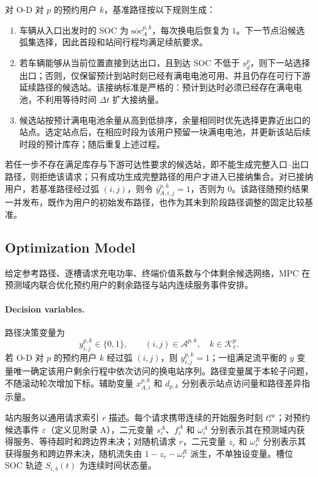 \documentclass[12pt,a4paper,UTF8]{ctexart}
\begin{document}
对 O-D 对 $p$ 的预约用户 $k$，基准路径按以下规则生成：
\begin{enumerate}
  \item 车辆从入口出发时的 SOC 为 $\overline{\mathrm{soc}}_A^{p,k}$，每次换电后恢复为 $1$。下一节点沿候选弧集选择，因此首段和站间行程均满足续航要求。
  \item 若车辆能够从当前位置直接到达出口，且到达 SOC 不低于 $\underline s_d^p$，则下一站选择出口；否则，仅保留预计到站时刻已经有满电电池可用、并且仍存在可行下游延续路径的候选站。该接纳标准是严格的：预计到达时必须已经存在满电电池，不利用等待时间 $\Delta t$ 扩大接纳量。
  \item 候选站按预计满电电池余量从高到低排序，余量相同时优先选择更靠近出口的站点。选定站点后，在相应时段为该用户预留一块满电电池，并更新该站后续时段的预计库存；随后重复上述过程。
\end{enumerate}

若任一步不存在满足库存与下游可达性要求的候选站，即不能生成完整入口--出口路径，则拒绝该请求；只有成功生成完整路径的用户才进入已接纳集合。对已接纳用户，若基准路径经过弧 $(i,j)$，则令 $\bar y_{A,i,j}^{p,k}=1$，否则为 $0$。该路径随预约结果一并发布，既作为用户的初始发布路径，也作为其未到阶段路径调整的固定比较基准。


\subsection{Optimization Model}

给定参考路径、逐槽请求充电功率、终端价值系数与个体剩余候选网络，MPC 在预测域内联合优化预约用户的剩余路径与站内连续服务事件安排。

\paragraph{Decision variables.}
路径决策变量为
\[
y_{i,j}^{p,k}\in\{0,1\},
\qquad
(i,j)\in\mathcal A^{p,k},
\quad
k\in\mathcal K_\ell^p.
\]
若 O-D 对 $p$ 的预约用户 $k$ 经过弧 $(i,j)$，则 $y_{i,j}^{p,k}=1$；一组满足流平衡的 $y$ 变量唯一确定该用户剩余行程中依次访问的换电站序列。路径变量属于本轮子问题，不随滚动轮次增加下标。辅助变量 $x_{A,i}^{p,k}$ 和 $d_{p,k}$ 分别表示站点访问量和路径差异指示量。

站内服务以通用请求索引 $r$ 描述。每个请求携带连续的开始服务时刻 $t_r^{\mathrm{sw}}$；对预约候选事件 $\varepsilon$（定义见附录 A），二元变量 $s_\varepsilon^A$、$f_\varepsilon^A$ 和 $\omega_\varepsilon^A$ 分别表示其在预测域内获得服务、等待超时和跨边界未决；对随机请求 $r$，二元变量 $z_r$ 和 $\omega_r^R$ 分别表示其获得服务和跨边界未决，随机流失由 $1-z_r-\omega_r^R$ 派生，不单独设变量。槽位 SOC 轨迹 $S_{i,b}(t)$ 为连续时间状态量。
\end{document}
